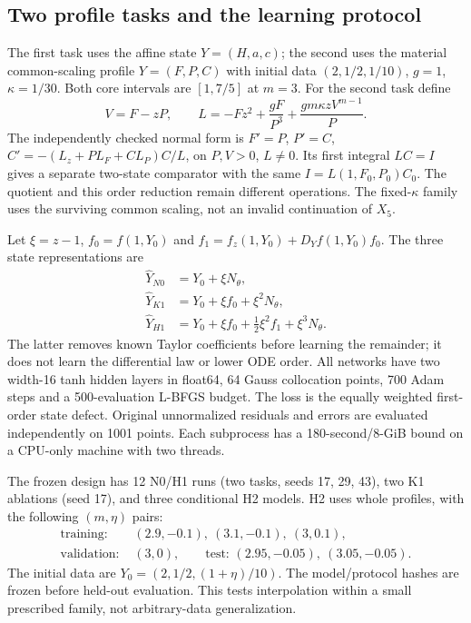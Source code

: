 \subsection{Two profile tasks and the learning protocol}
The first task uses the affine state $Y=(H,a,c)$; the second uses the
material common-scaling profile $Y=(F,P,C)$ with initial data
$(2,1/2,1/10)$, $g=1$, $\kappa=1/30$. Both core intervals are
$[1,7/5]$ at $m=3$. For the second task define
\[
 V=F-zP,\qquad
 L=-Fz^2+\frac{gF}{P^3}+\frac{gm\kappa zV^{m-1}}{P}.
\]
The independently checked normal form is
$F'=P$, $P'=C$,
$C'=-(L_z+P L_F+C L_P)C/L$, on $P,V>0$, $L\ne0$.
Its first integral $LC=I$ gives a separate two-state comparator with
the same $I=L(1,F_0,P_0)C_0$. The quotient and this order reduction
remain different operations. The fixed-$\kappa$ family uses the surviving
common scaling, not an invalid continuation of $X_5$.

Let $\xi=z-1$, $f_0=f(1,Y_0)$ and
$f_1=f_z(1,Y_0)+D_Yf(1,Y_0)f_0$. The three state representations are
\begin{align*}
 \widehat Y_{N0}&=Y_0+\xi N_\theta,\\
 \widehat Y_{K1}&=Y_0+\xi f_0+\xi^2N_\theta,\\
 \widehat Y_{H1}&=Y_0+\xi f_0+\tfrac12\xi^2 f_1+\xi^3N_\theta.
\end{align*}
The latter removes known Taylor coefficients before learning the remainder;
it does not learn the differential law or lower ODE order. All networks
have two width-16 tanh hidden layers in float64, 64 Gauss collocation
points, 700 Adam steps and a 500-evaluation L-BFGS budget. The loss is the
equally weighted first-order state defect. Original unnormalized residuals
and errors are evaluated independently on 1001 points. Each subprocess
has a 180-second/8-GiB bound on a CPU-only machine with two threads.

The frozen design has 12 N0/H1 runs (two tasks, seeds 17, 29, 43), two
K1 ablations (seed 17), and three conditional H2 models. H2 uses whole
profiles, with the following $(m,\eta)$ pairs:
\[
\begin{aligned}
\text{training: }&(2.9,-0.1),\ (3.1,-0.1),\ (3,0.1),\\
\text{validation: }&(3,0),\qquad
\text{test: }(2.95,-0.05),\ (3.05,-0.05).
\end{aligned}
\]
The initial data are
$Y_0=(2,1/2,(1+\eta)/10)$. The model/protocol hashes are frozen before
held-out evaluation. This tests interpolation within a small prescribed
family, not arbitrary-data generalization.

